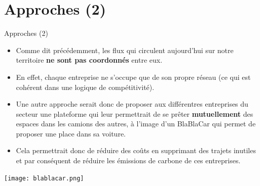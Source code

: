 \documentclass[8pt, aspectratio=169]{beamer}
\begin{document}
\section{Approches (2)}
\begin{frame}{Approches (2)}
\makeatletter
      \begin{minipage}[c][\textheight]{\textwidth}
        \begin{itemize}
            \item Comme dit précédemment, les flux qui circulent aujourd'hui sur notre territoire \textbf{ne sont pas coordonnés} entre eux.
            \saut
            
            \item En effet, chaque entreprise ne s'occupe que de son propre réseau (ce qui est cohérent dans une logique de compétitivité).
            \saut
            
            \item Une autre approche serait donc de proposer aux différentres entreprises du secteur une plateforme qui leur permettrait de se prêter \textbf{mutuellement} des espaces dans les camions des autres, à l'image d'un BlaBlaCar qui permet de proposer une place dans sa voiture.
            \saut
            
            \item Cela permettrait donc de réduire des coûts en supprimant des trajets inutiles et par conséquent de réduire les émissions de carbone de ces entreprises.
        \end{itemize}
        \begin{center}
            \texttt{[image: blablacar.png]}
        \end{center}
      \end{minipage}
\end{frame}
\end{document}
